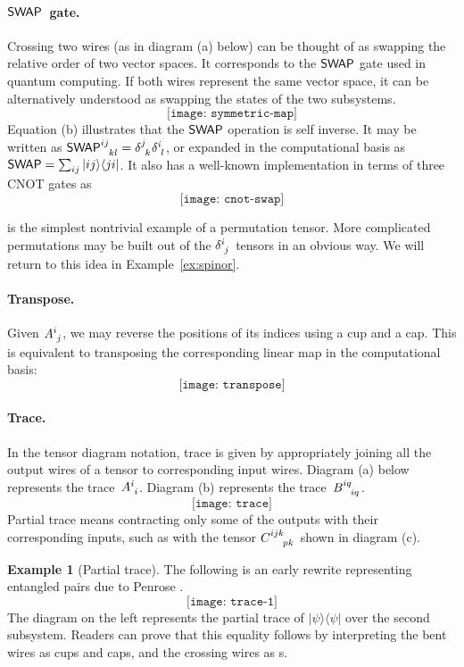 \documentclass[aps,pra,12pt,nofootinbib,superscriptaddress,longbibliography]{revtex4-1}
\theoremstyle{plain}
\theoremstyle{definition}
\newtheorem{example}[theorem]{Example}
\newcommand{\ketbra}[2]{\mbox{$|#1\rangle\langle #2|$}}
\newcommand{\swap}{{\sf{SWAP}}}
\newcommand{\be}{\begin{equation}}
\newcommand{\ee}{\end{equation}}
\begin{document}
\paragraph{{\bf $\swap$~gate.}}
Crossing two wires (as in diagram (a) below) can be thought of as swapping the relative order
of two vector spaces.
It corresponds to the $\swap$ gate used in quantum computing.
If both wires represent the same vector space, it can be alternatively
understood as swapping the states of the two subsystems.
\be\label{fig:sym}
 \texttt{[image: symmetric-map]}
\ee
Equation (b) illustrates that the $\swap$ operation is self inverse.
It may be written as
$\swap\indices{^{ij}_{kl}}=\delta\indices{^j_{k}}\delta\indices{^i_{l}}$,
or expanded in the computational basis as
$\swap = \sum_{ij} \ketbra{ij}{ji}$.
It also has a well-known implementation in terms of three CNOT gates as
\be
\texttt{[image: cnot-swap]}
\ee

\swap{} is the simplest nontrivial example of a permutation tensor. More
complicated permutations may be built out of the
$\delta\indices{^i_{j}}$ tensors in an obvious way.
We will return to this idea in Example~\ref{ex:spinor}.

\paragraph{{\bf Transpose.}} 
Given $A\indices{^i_j}$, we may reverse the positions of its indices using a cup and a cap.
This is equivalent to transposing the corresponding linear map in the computational basis:
\be
\label{eq:transpose}
\texttt{[image: transpose]}
\ee


\paragraph{{\bf Trace.}} 
In the tensor diagram notation, trace is given by appropriately joining
all the output wires of a tensor to corresponding input wires.
Diagram (a) below represents the trace~$A\indices{^i_i}$.
Diagram (b) represents the trace~$B\indices{^{iq}_{iq}}$.
\be
\texttt{[image: trace]}
\ee
Partial trace means contracting only some of the outputs with their
corresponding inputs, such as with the tensor $C\indices{^{ijk}_{pk}}$ shown in diagram (c).


\begin{example}[Partial trace]\label{ex:partial-trace}
The following is an early rewrite representing entangled pairs due to Penrose \cite{collected}.
\be
\texttt{[image: trace-1]}
\ee
The diagram on the left represents the partial trace of $\ketbra{\psi}{\psi}$ over the second subsystem.
Readers can prove that this equality follows by interpreting the bent wires as cups and caps, and the crossing wires as \swap{}s.
\end{example} 
\end{document}
